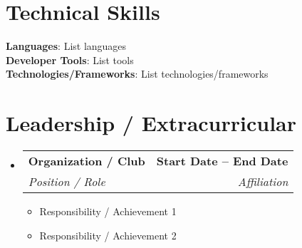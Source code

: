\documentclass[letterpaper,11pt]{article}
\makeatletter
\newcommand{\resumeItem}[1]{\item\small{#1 \vspace{-2pt}}}
\newcommand{\resumeSubheading}[4]{
  \vspace{-2pt}\item
  \begin{tabular*}{1.0\textwidth}[t]{l@{\extracolsep{\fill}}r}
    \textbf{#1} & \textbf{\small #2} \\
    \textit{\small#3} & \textit{\small #4} \\
  \end{tabular*}\vspace{-7pt}
}
\newcommand{\resumeItemListStart}{\begin{itemize}}
\newcommand{\resumeItemListEnd}{\end{itemize}\vspace{-5pt}}
\newcommand{\resumeSubHeadingListStart}{\begin{itemize}[leftmargin=0.0in, label={}]}
\newcommand{\resumeSubHeadingListEnd}{\end{itemize}}
\makeatother
\begin{document}
\section{Technical Skills}
\begin{itemize}[leftmargin=0.15in, label={}]
    \small{\item{
     \textbf{Languages}{: List languages} \\
     \textbf{Developer Tools}{: List tools} \\
     \textbf{Technologies/Frameworks}{: List technologies/frameworks} \\
    }}
\end{itemize}

\section{Leadership / Extracurricular}
\resumeSubHeadingListStart
  \resumeSubheading
    {Organization / Club}{Start Date -- End Date}
    {Position / Role}{Affiliation}
    \resumeItemListStart
        \resumeItem{Responsibility / Achievement 1}
        \resumeItem{Responsibility / Achievement 2}
    \resumeItemListEnd
\resumeSubHeadingListEnd
\end{document}
